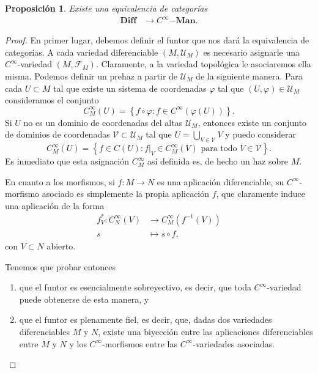 \documentclass[12pt,a4paper]{book}
\newtheorem{prop}[thm]{Proposición}
\theoremstyle{definition} \newtheorem{defn}[thm]{Definición}
\theoremstyle{definition} \newtheorem{ejemplo}[thm]{Ejemplo}
\theoremstyle{definition} \newtheorem{ejercicio}[thm]{Ejercicio}
\theoremstyle{remark} \newtheorem*{obs}{Observación}
\begin{document}
	  \begin{prop}\label{equiv1}
	    Existe una equivalencia de categorías 
	    \begin{align*}
	      \mathbf{Diff}&\longrightarrow C^{\infty}\mathbf{-Man}.
	      \end{align*}
	  \end{prop}

	  \begin{proof}
	    En primer lugar, debemos definir el funtor que nos dará la equivalencia de categorías. A cada variedad diferenciable $(M,\mathcal{U}_M)$ es necesario asignarle una $C^\infty$-variedad $(M,\mathscr{F}_M)$. Claramente, a la variedad topológica le asociaremos ella misma. Podemos definir un prehaz a partir de $\mathcal{U}_M$ de la siguiente manera. Para cada $U\subset M$ tal que existe un sistema de coordenadas $\varphi$ tal que $(U,\varphi)\in \mathcal{U}_M$ consideramos el conjunto
	    \begin{equation*}
	      C^\infty_M (U) = \left\{ f \circ \varphi : f \in C^{\infty}(\varphi(U))  \right\}.
	    \end{equation*}
	    Si $U$ no es un dominio de coordenadas del altas $\mathcal{U}_M$, entonces existe un conjunto de dominios de coordenadas $\mathcal{V}\subset \mathcal{U}_M$ tal que $U=\bigcup_{V\in \mathcal{V}} V$ y puedo considerar
	    \begin{equation*}
	      C^\infty_M (U) = \left\{f \in C(U) : f|_{V} \in C^\infty_M(V) \text{ para todo } V\in \mathcal{V}  \right\}.
	    \end{equation*}
	    Es inmediato que esta asignación $C^\infty_M$ así definida es, de hecho un haz sobre $M$.

	    En cuanto a los morfismos, si $f:M \rightarrow N$ es una aplicación diferenciable, su $C^\infty$-morfismo asociado es simplemente la propia aplicación $f$, que claramente induce una aplicación de la forma
	      \begin{align*}
		f^*_V : C^\infty_N(V) &\longrightarrow C^\infty_M(f^{-1}(V)) \\ 
		  s &\longmapsto s\circ f, 
		\end{align*}
		con $V\subset N$ abierto.

		Tenemos que probar entonces
		\begin{enumerate}
		  \item que el funtor es esencialmente sobreyectivo, es decir, que toda $C^\infty$-variedad puede obtenerse de esta manera, y
		  \item que el funtor es plenamente fiel, es decir, que, dadas dos variedades diferenciables $M$ y $N$, existe una biyección entre las aplicaciones diferenciables entre $M$ y $N$ y los $C^\infty$-morfismos entre las $C^\infty$-variedades asociadas.
		\end{enumerate}


\end{proof}
\end{document}
